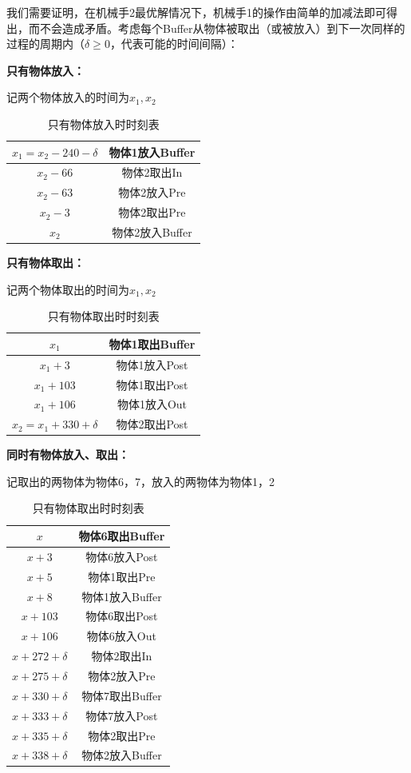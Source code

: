 \documentclass{ctexart}
\begin{document}
{{	我们需要证明，在机械手2最优解情况下，机械手1的操作由简单的加减法即可得出，而不会造成矛盾。考虑每个Buffer从物体被取出（或被放入）到下一次同样的过程的周期内（$\delta \ge 0$，代表可能的时间间隔）：
	
	\textbf{只有物体放入：}
	
	记两个物体放入的时间为$x_1,x_2$
	
	 \begin{table}[H]
		\centering
		\caption{只有物体放入时时刻表}
		\begin{tabular}{cc}
			\toprule
			$x_1=x_2-240-\delta$ & 物体1放入Buffer \\
			\midrule
			$x_2-66$ & 物体2取出In \\
			$x_2-63$ & 物体2放入Pre \\
			$x_2-3$ & 物体2取出Pre \\
			$x_2$ & 物体2放入Buffer \\
			\bottomrule
		\end{tabular}
	\end{table}

	\textbf{只有物体取出：}
	
	记两个物体取出的时间为$x_1,x_2$
	
	\begin{table}[H]
		\centering
		\caption{只有物体取出时时刻表}
		\begin{tabular}{cc}
			\toprule
			$x_1$ & 物体1取出Buffer  \\
			\midrule
			$x_1+3$ & 物体1放入Post  \\
			$x_1+103$ & 物体1取出Post  \\
			$x_1+106$ & 物体1放入Out \\
			$x_2=x_1+330+\delta$ & 物体2取出Post \\
			\bottomrule
		\end{tabular}
	\end{table}

	\textbf{同时有物体放入、取出：}
	
	记取出的两物体为物体6，7，放入的两物体为物体1，2
	
	\begin{table}[H]
		\centering
		\caption{只有物体取出时时刻表}
		\begin{tabular}{cc}
			\toprule
			$x$ & 物体6取出Buffer   \\
			\midrule
			$x+3$ &物体6放入Post  \\
			$x+5$ &物体1取出Pre  \\
			$x+8$ &物体1放入Buffer \\
			$x+103$ &物体6取出Post \\
			$x+106$ &物体6放入Out \\
			$x+272+\delta$ &物体2取出In \\
			$x+275+\delta$ &物体2放入Pre \\
			$x+330+\delta$ &物体7取出Buffer\\
			$x+333+\delta$ &物体7放入Post \\
			$x+335+\delta$ &物体2取出Pre  \\
			$x+338+\delta$ &物体2放入Buffer \\
			\bottomrule
		\end{tabular}
	\end{table}
	
}}
\end{document}
